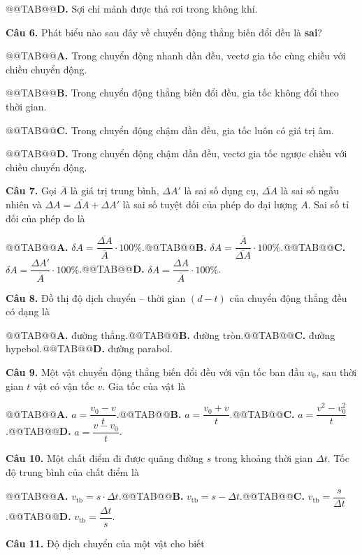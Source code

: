 \documentclass{article}
\begin{document}
@@TAB@@\textbf{D.} Sợi chỉ mảnh được thả rơi trong không khí.

\textbf{Câu 6.} Phát biểu nào sau đây về chuyển động thẳng biến đổi đều là \textbf{sai}?

@@TAB@@\textbf{A.} Trong chuyển động nhanh dần đều, vectơ gia tốc cùng chiều với chiều chuyển động.

@@TAB@@\textbf{B.} Trong chuyển động thẳng biến đổi đều, gia tốc không đổi theo thời gian.

@@TAB@@\textbf{C.} Trong chuyển động chậm dần đều, gia tốc luôn có giá trị âm.

@@TAB@@\textbf{D.} Trong chuyển động chậm dần đều, vectơ gia tốc ngược chiều với chiều chuyển động.

\textbf{Câu 7.} Gọi $\overline{A}$ là giá trị trung bình, $\Delta A'$ là sai số dụng cụ, $\overline{\Delta A}$ là sai số ngẫu nhiên và $\Delta A = \overline{\Delta A} + \Delta A'$ là sai số tuyệt đối của phép đo đại lượng $A$. Sai số tỉ đối của phép đo là

@@TAB@@\textbf{A.} $\delta A = \dfrac{\overline{\Delta A}}{\overline{A}} \cdot 100\%$.@@TAB@@\textbf{B.} $\delta A = \dfrac{\overline{A}}{\overline{\Delta A}} \cdot 100\%$.@@TAB@@\textbf{C.} $\delta A = \dfrac{\Delta A'}{\overline{A}} \cdot 100\%$.@@TAB@@\textbf{D.} $\delta A = \dfrac{\Delta A}{\overline{A}} \cdot 100\%$.

\textbf{Câu 8.} Đồ thị độ dịch chuyển -- thời gian $(d - t)$ của chuyển động thẳng đều có dạng là

@@TAB@@\textbf{A.} đường thẳng.@@TAB@@\textbf{B.} đường tròn.@@TAB@@\textbf{C.} đường hypebol.@@TAB@@\textbf{D.} đường parabol.

\textbf{Câu 9.} Một vật chuyển động thẳng biến đổi đều với vận tốc ban đầu $v_0$, sau thời gian $t$ vật có vận tốc $v$. Gia tốc của vật là

@@TAB@@\textbf{A.} $a = \dfrac{v_0 - v}{t}$.@@TAB@@\textbf{B.} $a = \dfrac{v_0 + v}{t}$.@@TAB@@\textbf{C.} $a = \dfrac{v^2 - v_0^2}{t}$.@@TAB@@\textbf{D.} $a = \dfrac{v - v_0}{t}$.

\textbf{Câu 10.} Một chất điểm đi được quãng đường $s$ trong khoảng thời gian $\Delta t$. Tốc độ trung bình của chất điểm là

@@TAB@@\textbf{A.} $v_{\text{tb}} = s \cdot \Delta t$.@@TAB@@\textbf{B.} $v_{\text{tb}} = s - \Delta t$.@@TAB@@\textbf{C.} $v_{\text{tb}} = \dfrac{s}{\Delta t}$.@@TAB@@\textbf{D.} $v_{\text{tb}} = \dfrac{\Delta t}{s}$.

\textbf{Câu 11.} Độ dịch chuyển của một vật cho biết
\end{document}
